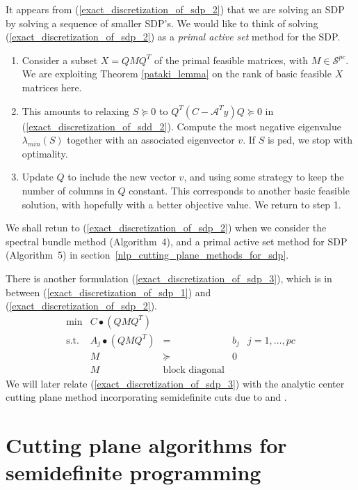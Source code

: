 \documentclass[12pt]{kluwer}
\begin{document}
\begin{article}
It appears from (\ref{exact_discretization_of_sdp_2}) that we are solving an SDP
by solving a sequence of smaller SDP's. We would like to think of solving
(\ref{exact_discretization_of_sdp_2}) as a {\em primal active set} method for
the SDP.
\begin{enumerate}
\item Consider a subset $X = QMQ^T$ of the primal feasible matrices, with
$M \in \mathcal{S}^{pc}$. We are exploiting Theorem \ref{pataki_lemma} on the rank
of basic feasible $X$ matrices here. 
\item This amounts to relaxing $S \succeq 0$ to
$Q^T(C-\mathcal{A}^Ty)Q \succeq 0$ in (\ref{exact_discretization_of_sdd_2}).
Compute the most negative eigenvalue $\lambda_{min}(S)$ together with an associated
eigenvector $v$. If $S$ is psd, we stop with optimality.
\item Update $Q$ to include the new vector $v$, and using some strategy to keep
the number of columns in $Q$ constant. This corresponds to another basic feasible solution,
with hopefully with a better objective value. We return to step 1.
\end{enumerate}
We shall retun to (\ref{exact_discretization_of_sdp_2}) when we consider the spectral bundle
method (Algorithm~4), and a primal active set method for SDP (Algorithm~5) in
section~\ref{nlp_cutting_plane_methods_for_sdp}.

There is another formulation (\ref{exact_discretization_of_sdp_3}), which is in between
(\ref{exact_discretization_of_sdp_1}) and (\ref{exact_discretization_of_sdp_2}).
\begin{equation}
\label{exact_discretization_of_sdp_3}
\begin{array}{lrccc}
\min & C \bullet (QMQ^T) \\
\mbox{s.t.} & A_j \bullet (QMQ^T) & = & b_j & j=1,\ldots,pc \\
& M & \succeq & 0 \\
& M & \mbox{block diagonal}
\end{array}
\end{equation}
We will later relate (\ref{exact_discretization_of_sdp_3}) with the analytic center cutting plane
method incorporating semidefinite cuts due to
 and .

\section{Cutting plane algorithms for  semidefinite programming}


\end{article}
\end{document}

